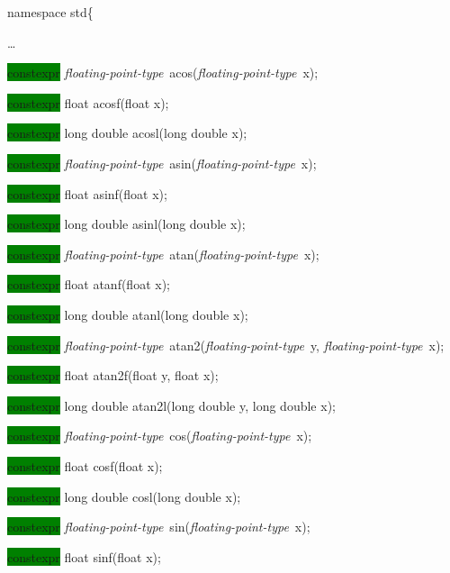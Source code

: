 \documentclass[prd,twocolumn,amsmath,amssymb,nofootinbib,eqsecnum]{revtex4-1}
\newcommand{\code}[1]{{\tt #1}}
\newcommand{\highlight}[1]{\colorbox{green}{\!\!\!\! #1}}
\newcommand{\fptype}{{\it floating-point-type}}
\begin{document}
\code{

namespace std\{

\vspace{2ex}
\ldots
\vspace{2ex}


\highlight{constexpr} \fptype\ acos(\fptype\ x);

\highlight{constexpr} float acosf(float x);

\highlight{constexpr} long double acosl(long double x);

\vspace{2ex}


\highlight{constexpr} \fptype\ asin(\fptype\ x);

\highlight{constexpr} float asinf(float x);

\highlight{constexpr} long double asinl(long double x);

\vspace{2ex}


\highlight{constexpr} \fptype\ atan(\fptype\ x);

\highlight{constexpr} float atanf(float x);

\highlight{constexpr} long double atanl(long double x);

\vspace{2ex}


\highlight{constexpr} \fptype\ atan2(\fptype\ y, \fptype\ x);

\highlight{constexpr} float atan2f(float y, float x);

\highlight{constexpr} long double atan2l(long double y, long double x);

\vspace{2ex}


\highlight{constexpr} \fptype\ cos(\fptype\ x);

\highlight{constexpr} float cosf(float x);

\highlight{constexpr} long double cosl(long double x);

\vspace{2ex}


\highlight{constexpr} \fptype\ sin(\fptype\ x);

\highlight{constexpr} float sinf(float x);

}
\end{document}
